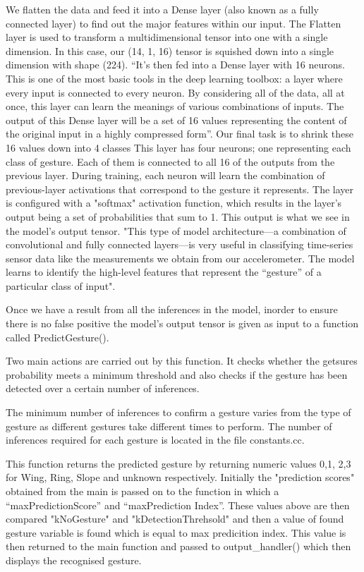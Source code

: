 We flatten the data and feed it into a Dense layer (also known as a fully connected layer) to find out the major features within our input. 
The Flatten layer is used to transform a multidimensional tensor into one with a
single dimension. In this case, our (14, 1, 16) tensor is squished down into a single
dimension with shape (224).
``It's then fed into a Dense layer with 16 neurons. This is one of the most basic tools in
the deep learning toolbox: a layer where every input is connected to every neuron. By
considering all of the data, all at once, this layer can learn the meanings of various
combinations of inputs. The output of this Dense layer will be a set of 16 values representing
the content of the original input in a highly compressed form''.\cite{Warden:2020}
Our final task is to shrink these 16 values down into 4 classes
This layer has four neurons; one representing each class of gesture. Each of them is
connected to all 16 of the outputs from the previous layer. During training, each neuron
will learn the combination of previous-layer activations that correspond to the
gesture it represents.
The layer is configured with a "softmax" activation function, which results in the layer's
output being a set of probabilities that sum to 1. This output is what we see in the
model's output tensor.
"This type of model architecture—a combination of convolutional and fully connected
layers—is very useful in classifying time-series sensor data like the measurements we
obtain from our accelerometer. The model learns to identify the high-level features
that represent the “gesture” of a particular class of input".\cite{Warden:2020}

Once we have a result from all the inferences in the model, inorder to ensure there is no false positive the model's output tensor is given as input to a function called PredictGesture().

Two main actions are carried out by this function. It checks whether the getsures probability meets a minimum threshold and also checks if the gesture has been detected over a certain number of inferences. 

The minimum number of inferences to confirm a gesture varies from the type of gesture as different gestures take different times to perform. The number of inferences required for each gesture is located in the file constants.cc. \cite{Warden:2020}

This function returns the predicted gesture by returning numeric values 0,1, 2,3 for Wing, Ring, Slope and unknown respectively. 
Initially the "prediction scores" obtained from the main is passed on to the function in which a ``maxPredictionScore'' and ``maxPrediction Index''.
These values  above are then compared "kNoGesture" and "kDetectionThrehsold" and then a value of found gesture variable is found which is equal to max predicition index. This value is then returned to the main function and passed to output\_handler() which then displays the recognised gesture. \cite{Warden:2020}


